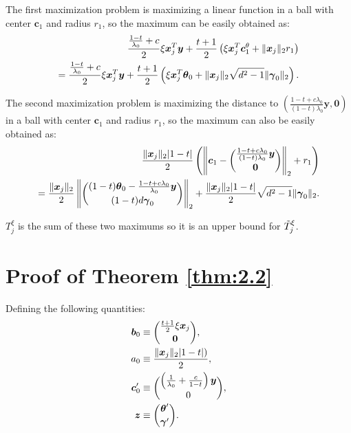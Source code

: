 The first maximization problem is maximizing a linear function in a ball with center $\boldsymbol c_1$ and radius $r_1$, so the maximum can be easily obtained as:
\begin{gather}
    \begin{aligned}
        \frac{\frac{1-t}{\lambda_0}+c}{2}\xi\boldsymbol x_j^T \boldsymbol y+\frac{t+1}{2}\left(\xi \boldsymbol x_j^T \boldsymbol c_1^\theta+\lVert\boldsymbol x_j\rVert_2r_1\right)\\
        =\frac{\frac{1-t}{\lambda_0}+c}{2}\xi\boldsymbol x_j^T \boldsymbol y+\frac{t+1}{2}\left(\xi \boldsymbol x_j^T \boldsymbol \theta_{0}+\lVert\boldsymbol x_j\rVert_2\sqrt{d^2-1}\lVert\boldsymbol\gamma_{0}\rVert_2\right).
    \end{aligned}
\end{gather}

The second maximization problem is maximizing the distance to $\left(\frac{1-t+c\lambda_0}{(1-t)\lambda_0}\boldsymbol y,\boldsymbol 0\right)$ in a ball with center $\boldsymbol c_1$ and radius $r_1$, so the maximum can also be easily obtained as:
\begin{gather}
    \begin{aligned}
        \frac{\lVert\boldsymbol x_j\rVert_2|1-t|}{2}\left(\left\Vert\boldsymbol c_1-\binom{\frac{1-t+c\lambda_0}{(1-t)\lambda_0}\boldsymbol y}{\boldsymbol 0}\right\Vert_2+r_1\right)\\
        =\frac{\lVert\boldsymbol x_j\rVert_2}{2}\left\Vert\binom{(1-t)\boldsymbol\theta_{0}-\frac{1-t+c\lambda_0}{\lambda_0}\boldsymbol y}{(1-t)d\boldsymbol\gamma_{0}}\right\Vert_2+\frac{\lVert\boldsymbol x_j\rVert_2|1-t|}{2}\sqrt{d^2-1}\lVert\boldsymbol\gamma_0\rVert_2.
    \end{aligned}
\end{gather}

$T^\xi_j$ is the sum of these two maximums so it is an upper bound for $\Tilde{T}^\xi_j$.

\iffalse
\section{Proof of Theorem \ref{thm:2.2}}

Defining the following quantities:
\begin{gather}
    \begin{aligned}
        \boldsymbol b_0&\equiv\binom{\frac{t+1}{2}\xi \boldsymbol x_j}{\boldsymbol 0},\\
        a_0&\equiv\frac{\lVert\boldsymbol x_j\rVert_2|1-t|)}{2},\\
        \boldsymbol c_0'&\equiv\binom{\left(\frac{1}{\lambda_0}+\frac{c}{1-t}\right)\boldsymbol y}{0},\\
        \boldsymbol z &\equiv \binom{\boldsymbol\theta'}{\boldsymbol\gamma'}.
    \end{aligned}
\end{gather}

